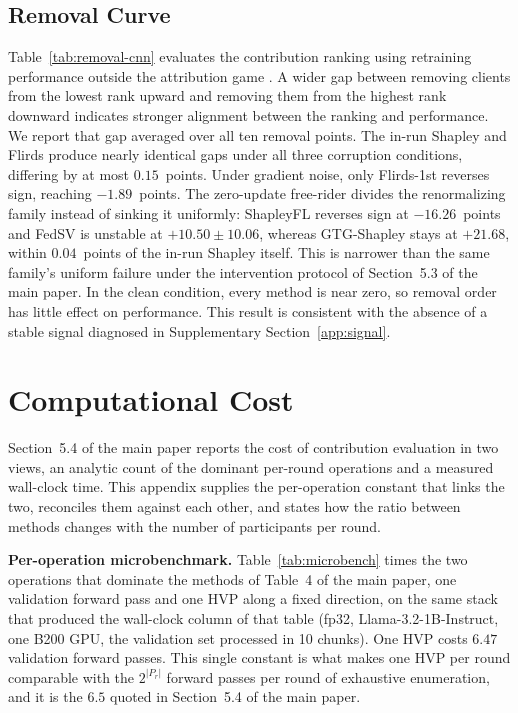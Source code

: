 \documentclass[letterpaper]{article} %
\theoremstyle{plain}
\begin{document}
\subsection{Removal Curve}
\label{app:removal}

Table~\ref{tab:removal-cnn} evaluates the contribution ranking using
retraining performance outside the attribution game \citep{jia2019towards}. A wider gap between
removing clients from the lowest rank upward and removing them from the
highest rank downward indicates stronger alignment between the ranking and
performance. We report that gap averaged over all ten removal points. The
in-run Shapley and Flirds produce nearly identical gaps
under all three corruption conditions, differing by at most $0.15$~points.
Under gradient noise, only Flirds-1st reverses sign, reaching $-1.89$~points.
The zero-update free-rider divides the renormalizing family instead of
sinking it uniformly: ShapleyFL reverses sign at $-16.26$~points and FedSV
is unstable at
$+10.50\pm10.06$, whereas GTG-Shapley stays at $+21.68$, within $0.04$~points
of the in-run Shapley itself. This is narrower than the same family's uniform
failure under the intervention protocol of Section~5.3 of the main paper.
In the clean condition, every method is near zero, so removal
order has little effect on performance. This result is consistent with the
absence of a stable signal diagnosed in Supplementary
Section~\ref{app:signal}.

\section{Computational Cost}
\label{app:cost}

Section~5.4 of the main paper reports the cost of contribution evaluation in
two views, an analytic count of the dominant per-round operations and a
measured wall-clock time. This appendix supplies the per-operation constant
that links the two, reconciles them against each other, and states how the
ratio between methods changes with the number of participants per round.

\textbf{Per-operation microbenchmark.} Table~\ref{tab:microbench} times the two
operations that dominate the methods of Table~4 of the main paper, one
validation forward pass and one HVP along a fixed direction, on the same stack
that produced the wall-clock column of that table (fp32,
Llama-3.2-1B-Instruct, one B200 GPU, the validation set processed in 10
chunks). One HVP costs $6.47$ validation forward passes. This single constant
is what makes one HVP per round comparable with the $2^{|P_r|}$ forward passes
per round of exhaustive enumeration, and it is the $6.5$ quoted in
Section~5.4 of the main paper.
\end{document}
